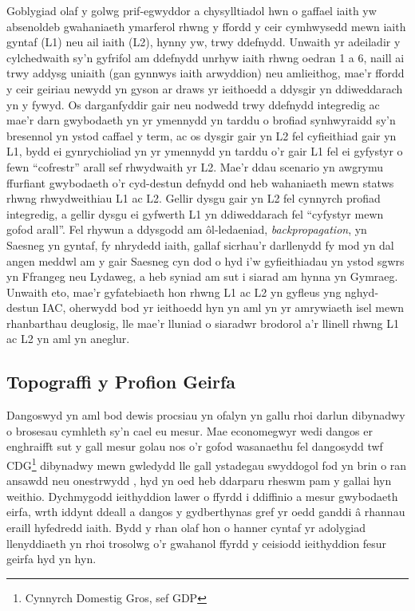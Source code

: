 Goblygiad olaf y golwg prif-egwyddor a chysylltiadol hwn o gaffael iaith yw absenoldeb gwahaniaeth ymarferol rhwng y ffordd y ceir cymhwysedd mewn iaith gyntaf (L1) neu ail iaith (L2), hynny yw, trwy ddefnydd. Unwaith yr adeiladir y cylchedwaith sy'n gyfrifol am ddefnydd unrhyw iaith rhwng oedran 1 a 6, naill ai trwy addysg uniaith (gan gynnwys iaith arwyddion) neu amlieithog, mae'r ffordd y ceir geiriau newydd yn gyson ar draws yr ieithoedd a ddysgir yn ddiweddarach yn y fywyd. Os darganfyddir gair neu nodwedd trwy ddefnydd integredig ac mae'r darn gwybodaeth yn yr ymennydd yn tarddu o brofiad synhwyraidd sy'n bresennol yn ystod caffael y term, ac os dysgir gair yn L2 fel cyfieithiad gair yn L1, bydd ei gynrychioliad yn yr ymennydd yn tarddu o'r gair L1 fel ei gyfystyr o fewn ``cofrestr'' arall sef rhwydwaith yr L2. Mae'r ddau scenario yn awgrymu ffurfiant gwybodaeth o'r cyd-destun defnydd ond heb wahaniaeth mewn statws rhwng rhwydweithiau L1 ac L2. Gellir dysgu gair yn L2 fel cynnyrch profiad integredig, a gellir dysgu ei gyfwerth L1 yn ddiweddarach fel ``cyfystyr mewn gofod arall''. Fel rhywun a ddysgodd am ôl-ledaeniad, \textit{backpropagation}, yn Saesneg yn gyntaf, fy nhrydedd iaith, gallaf sicrhau'r darllenydd fy mod yn dal angen meddwl am y gair Saesneg cyn dod o hyd i'w gyfieithiadau yn ystod sgwrs yn Ffrangeg neu Lydaweg, a heb syniad am sut i siarad am hynna yn Gymraeg. Unwaith eto, mae'r gyfatebiaeth hon rhwng L1 ac L2 yn gyfleus yng nghyd-destun IAC, oherwydd bod yr ieithoedd hyn yn aml yn yr amrywiaeth isel mewn rhanbarthau deuglosig, lle mae'r lluniad o siaradwr brodorol a'r llinell rhwng L1 ac L2 yn aml yn aneglur.

\subsection{Topograffi y Profion Geirfa}
Dangoswyd yn aml bod dewis procsiau yn ofalyn yn gallu rhoi darlun dibynadwy o brosesau cymhleth sy'n cael eu mesur. Mae economegwyr wedi dangos er enghraifft sut y gall mesur golau nos o'r gofod wasanaethu fel dangosydd twf CDG\footnote{Cynnyrch Domestig Gros, sef GDP} dibynadwy mewn gwledydd lle gall ystadegau swyddogol fod yn brin o ran ansawdd neu onestrwydd \parencite{henderson_measuring_2009}, hyd yn oed heb ddarparu rheswm pam y gallai hyn weithio. Dychmygodd ieithyddion lawer o ffyrdd i ddiffinio a mesur gwybodaeth eirfa, wrth iddynt ddeall a dangos y gydberthynas gref yr oedd ganddi â rhannau eraill hyfedredd iaith. Bydd y rhan olaf hon o hanner cyntaf yr adolygiad llenyddiaeth yn rhoi trosolwg o'r gwahanol ffyrdd y ceisiodd ieithyddion fesur geirfa hyd yn hyn.

